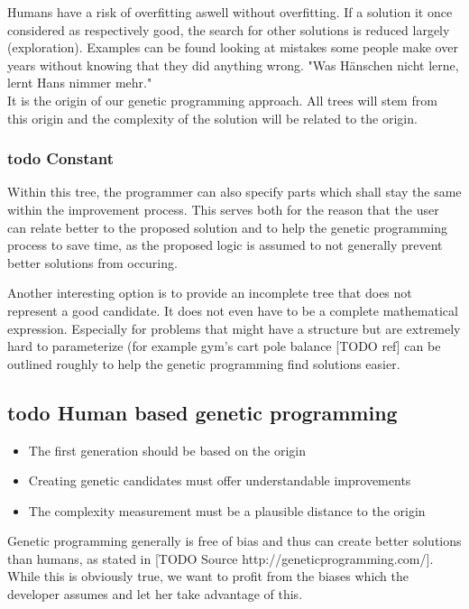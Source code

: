 Humans have a risk of overfitting aswell without overfitting. If a solution it once considered as respectively good, the search for other solutions is reduced largely (exploration). Examples can be found looking at mistakes some people make over years without knowing that they did anything wrong. "Was Hänschen nicht lerne, lernt Hans nimmer mehr."\\


It is the origin of our genetic programming approach. All trees will stem from this origin  and the complexity of the solution will be related to the origin.

\subsubsection{todo Constant}
Within this tree, the programmer can also specify parts which shall stay the same within the improvement process. This serves both for the reason that the user can relate better to the proposed solution and to help the genetic programming process to save time, as the proposed logic is assumed to not generally prevent better solutions from occuring.

Another interesting option is to provide an incomplete tree that does not represent a good candidate. It does not even have to be a complete mathematical expression. Especially for problems that might have a structure but are extremely hard to parameterize (for example gym's cart pole balance [TODO ref] can be outlined roughly to help the genetic programming find solutions easier.

\subsection{todo Human based genetic programming}

\begin{itemize}
    \item The first generation should be based on the origin
    \item Creating genetic candidates must offer understandable improvements
    \item The complexity measurement must be a plausible distance to the origin
\end{itemize}

Genetic programming generally is free of bias and thus can create better solutions than humans, as stated in [TODO Source http://geneticprogramming.com/]. While this is obviously true, we want to profit from the biases which the developer assumes and let her take advantage of this.

